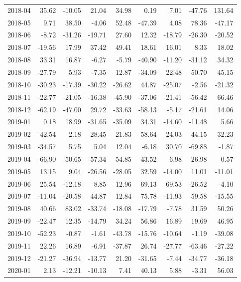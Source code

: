 \begin{table}[ht]
\begin{tabular}{lrrrrrrrr}
  2018-04 & 35.62 & -10.05 & 21.04 & 34.98 & 0.19 & 7.01 & -47.76 & 131.64 \\ 
  2018-05 & 9.71 & 38.50 & -4.06 & 52.48 & -47.39 & 4.08 & 78.36 & -47.17 \\ 
  2018-06 & -8.72 & -31.26 & -19.71 & 27.60 & 12.32 & -18.79 & -26.30 & -20.52 \\ 
  2018-07 & -19.56 & 17.99 & 37.42 & 49.41 & 18.61 & 16.01 & 8.33 & 18.02 \\ 
  2018-08 & 33.31 & 16.87 & -6.27 & -5.79 & -40.90 & -11.20 & -31.12 & 34.32 \\ 
  2018-09 & -27.79 & 5.93 & -7.35 & 12.87 & -34.09 & 22.48 & 50.70 & 45.15 \\ 
  2018-10 & -30.23 & -17.39 & -30.22 & -26.62 & 44.87 & -25.07 & -2.56 & -21.32 \\ 
  2018-11 & -22.77 & -21.05 & -16.38 & -45.90 & -37.06 & -21.41 & -56.42 & 66.46 \\ 
  2018-12 & -62.19 & -47.00 & 29.72 & -33.63 & -58.13 & -5.17 & -21.61 & 14.06 \\ 
  2019-01 & 0.18 & 18.99 & -31.65 & -35.09 & 34.31 & -14.60 & -11.48 & 5.66 \\ 
  2019-02 & -42.54 & -2.18 & 28.45 & 21.83 & -58.64 & -24.03 & 44.15 & -32.23 \\ 
  2019-03 & -34.57 & 5.75 & 5.04 & 12.04 & -6.18 & 30.70 & -69.88 & -1.87 \\ 
  2019-04 & -66.90 & -50.65 & 57.34 & 54.85 & 43.52 & 6.98 & 26.98 & 0.57 \\ 
  2019-05 & 13.15 & 9.04 & -26.56 & -28.05 & 32.59 & -14.00 & 11.01 & -11.01 \\ 
  2019-06 & 25.54 & -12.18 & 8.85 & 12.96 & 69.13 & 69.53 & -26.52 & -4.10 \\ 
  2019-07 & -11.04 & -20.58 & 44.87 & 12.84 & 75.78 & -11.93 & 59.58 & -15.55 \\ 
  2019-08 & 40.66 & 83.02 & -33.74 & -18.08 & -17.79 & -7.78 & 31.59 & 50.26 \\ 
  2019-09 & -22.47 & 12.35 & -14.79 & 34.24 & 56.86 & 16.89 & 19.69 & 46.95 \\ 
  2019-10 & -52.23 & -0.87 & -1.61 & -43.78 & -15.76 & -10.64 & -1.19 & -39.08 \\ 
  2019-11 & 22.26 & 16.89 & -6.91 & -37.87 & 26.74 & -27.77 & -63.46 & -27.22 \\ 
  2019-12 & -21.27 & -36.94 & -13.77 & 21.20 & -31.65 & -7.44 & -34.77 & -36.18 \\ 
  2020-01 & 2.13 & -12.21 & -10.13 & 7.41 & 40.13 & 5.88 & -3.31 & 56.03 \\ 

\end{tabular}
\end{table}
